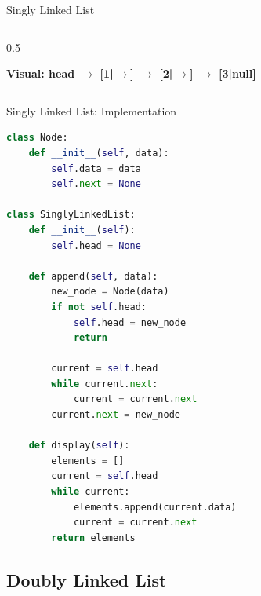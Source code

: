 \documentclass[aspectratio=169,xcolor=dvipsnames]{beamer}
\begin{document}
\begin{frame}{Singly Linked List}
\begin{columns}
\begin{column}{0.5\textwidth}
\begin{center}
      \end{center}

      \vspace{0.5cm}
      \textbf{Visual: head $\to$ [1|$\to$] $\to$ [2|$\to$] $\to$ [3|null]}
    \end{column}
  \end{columns}
\end{frame}

\begin{frame}[fragile]{Singly Linked List: Implementation}
\begin{lstlisting}[language=Python, basicstyle=\tiny\ttfamily]
class Node:
    def __init__(self, data):
        self.data = data
        self.next = None

class SinglyLinkedList:
    def __init__(self):
        self.head = None

    def append(self, data):
        new_node = Node(data)
        if not self.head:
            self.head = new_node
            return

        current = self.head
        while current.next:
            current = current.next
        current.next = new_node

    def display(self):
        elements = []
        current = self.head
        while current:
            elements.append(current.data)
            current = current.next
        return elements
\end{lstlisting}
\end{frame}

\subsection{Doubly Linked List}
\end{document}
